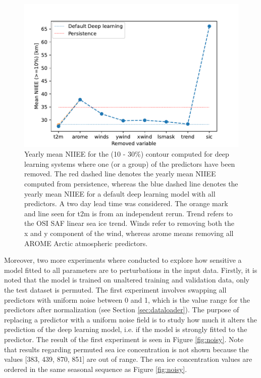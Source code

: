 \documentclass[../main/thesis.tex]{subfiles}
\begin{document}
\begin{figure}
    \centering
    \includegraphics[width=\textwidth]{leave_one_out.pdf}
    \caption{\label{fig:leave-one-out}Yearly mean NIIEE for the (10 - 30\%) contour computed for deep learning systems where one (or a group) of the predictors have been removed. The red dashed line denotes the yearly mean NIIEE computed from persistence, whereas the blue dashed line denotes the yearly mean NIIEE for a default deep learning model with all predictors. A two day lead time was considered. The orange mark and line seen for t2m is from an independent rerun. Trend refers to the OSI SAF linear sea ice trend. Winds refer to removing both the x and y component of the wind, whereas arome means removing all AROME Arctic atmospheric predictors.}
\end{figure}

Moreover, two more experiments where conducted to explore how sensitive a model fitted to all parameters are to perturbations in the input data. Firstly, it is noted that the model is trained on unaltered training and validation data, only the test dataset is permuted. The first experiment involves swapping all predictors with uniform noise between 0 and 1, which is the value range for the predictors after normalization (see Section \ref{sec:dataloader}). The purpose of replacing a predictor with a uniform noise field is to study how much it alters the prediction of the deep learning model, i.e. if the model is strongly fitted to the predictor. The result of the first experiment is seen in Figure \ref{fig:noisy}. Note that results regarding permuted sea ice concentration is not shown because the values [383, 439, 870, 851] are out of range. The sea ice concentration values are ordered in the same seasonal sequence as Figure \ref{fig:noisy}.
\end{document}
